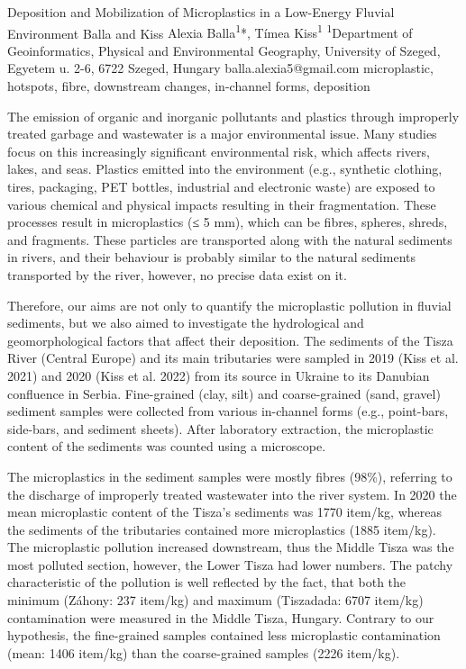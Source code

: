 \abstract
{Deposition and Mobilization of Microplastics in a Low-Energy Fluvial Environment} 
{Balla and Kiss} 
{Alexia Balla\textsuperscript{1}*, Tímea Kiss\textsuperscript{1}} 
{\TLtag} 
{
\textsuperscript{1}Department of Geoinformatics, Physical and Environmental Geography, University of Szeged, Egyetem u. 2-6, 6722 Szeged, Hungary
}
{balla.alexia5@gmail.com}  %
{microplastic, hotspots, fibre, downstream changes, in-channel forms, deposition}
{The emission of organic and inorganic pollutants and plastics through improperly treated garbage and wastewater is a major environmental issue. Many studies focus on this increasingly significant environmental risk, which affects rivers, lakes, and seas. Plastics emitted into the environment (e.g., synthetic clothing, tires, packaging, PET bottles, industrial and electronic waste) are exposed to various chemical and physical impacts resulting in their fragmentation. These processes result in microplastics (≤ 5 mm), which can be fibres, spheres, shreds, and fragments. These particles are transported along with the natural sediments in rivers, and their behaviour is probably similar to the natural sediments transported by the river, however, no precise data exist on it. 

Therefore, our aims are not only to quantify the microplastic pollution in fluvial sediments, but we also aimed to investigate the hydrological and geomorphological factors that affect their deposition. The sediments of the Tisza River (Central Europe) and its main tributaries were sampled in 2019 (Kiss et al. 2021) and 2020 (Kiss et al. 2022) from its source in Ukraine to its Danubian confluence in Serbia. Fine-grained (clay, silt) and coarse-grained (sand, gravel) sediment samples were collected from various in-channel forms (e.g., point-bars, side-bars, and sediment sheets). After laboratory extraction, the microplastic content of the sediments was counted using a microscope.

The microplastics in the sediment samples were mostly fibres (98\%), referring to the discharge of improperly treated wastewater into the river system. In 2020 the mean microplastic content of the Tisza’s sediments was 1770 item/kg, whereas the sediments of the tributaries contained more microplastics (1885 item/kg). The microplastic pollution increased downstream, thus the Middle Tisza was the most polluted section, however, the Lower Tisza had lower numbers. The patchy characteristic of the pollution is well reflected by the fact, that both the minimum (Záhony: 237 item/kg) and maximum (Tiszadada: 6707 item/kg) contamination were measured in the Middle Tisza, Hungary.
Contrary to our hypothesis, the fine-grained samples contained less microplastic contamination (mean: 1406 item/kg) than the coarse-grained samples (2226 item/kg). 

}
